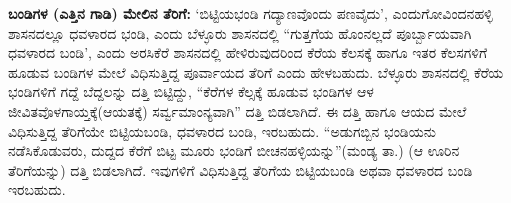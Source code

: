 \textbf{ಬಂಡಿಗಳ (ಎತ್ತಿನ ಗಾಡಿ) ಮೇಲಿನ ತೆರಿಗೆ:} ‘ಬಿಟ್ಟಿಯಭಂಡಿ ಗದ್ಯಾಣವೊಂದು ಪಣವೈದು’, ಎಂದು\break ಗೋವಿಂದನಹಳ್ಳಿ ಶಾಸನದಲ್ಲೂ ಧವಳಾರದ ಭಂಡಿ, ಎಂದು ಬೆಳ್ಳೂರು ಶಾಸನದಲ್ಲಿ “ಗುತ್ತಗೆಯ ಹೊಂನಲ್ಲದೆ ಪೂರ್ಬ್ಬಾಯ\-ವಾಗಿ ಧವಳಾರದ ಬಂಡಿ’, ಎಂದು ಅರಸಿಕೆರೆ ಶಾಸನದಲ್ಲಿ ಹೇಳಿರುವುದರಿಂದ ಕೆರೆಯ ಕೆಲಸಕ್ಕೆ ಹಾಗೂ ಇತರ ಕೆಲಸಗಳಿಗೆ ಹೂಡುವ ಬಂಡಿಗಳ ಮೇಲೆ ವಿಧಿಸುತ್ತಿದ್ದ ಪೂರ್ವಾಯದ ತೆರಿಗೆ ಎಂದು ಹೇಳಬಹುದು. ಬೆಳ್ಳೂರು ಶಾಸನದಲ್ಲಿ ಕೆರೆಯ ಭಂಡಿಗಳಿಗೆ ಗದ್ದೆ ಬೆದ್ದಲನ್ನು ದತ್ತಿ ಬಿಟ್ಟಿದ್ದು, “ಕೆರೆಗಳ ಕೆಲ್ಸಕ್ಕೆ ಹೂಡುವ ಭಂಡಿಗಳ ಆಳ ಜೀವಿತವೊಳಗಾಯ್ತಕ್ಕೆ(ಆಯತಕ್ಕೆ) ಸರ್ವ್ವಮಾಂನ್ಯವಾಗಿ” ದತ್ತಿ ಬಿಡಲಾಗಿದೆ. ಈ ದತ್ತಿ ಹಾಗೂ ಆಯದ ಮೇಲೆ ವಿಧಿಸುತ್ತಿದ್ದ ತೆರಿಗೆಯೇ ಬಿಟ್ಟಿಯಬಂಡಿ, ಧವಳಾರದ ಬಂಡಿ, ಇರಬಹುದು. “ಅಡುಗಬ್ಬಿನ ಭಂಡಿಯನು ನಡೆಸಿಕೊಡುವರು, ದುದ್ದದ ಕೆರೆಗೆ ಬಿಟ್ಟ ಮೂರು ಭಂಡಿಗೆ ಬೀಚನಹಳ್ಳಿಯನ್ನು”(ಮಂಡ್ಯ ತಾ.) (ಆ ಊರಿನ ತೆರಿಗೆಯನ್ನು) ದತ್ತಿ ಬಿಡಲಾಗಿದೆ. ಇವುಗಳಿಗೆ ವಿಧಿಸುತ್ತಿದ್ದ ತೆರಿಗೆಯ ಬಿಟ್ಟಿಯಬಂಡಿ ಅಥವಾ ಧವಳಾರದ ಬಂಡಿ ಇರಬಹುದು.

